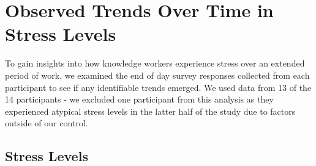 %



\section{Observed Trends Over Time in Stress  Levels}
\label{stressTrends}

To gain insights into how knowledge workers experience stress  over an
extended period of work, we examined the end of day survey responses
collected from each participant to see if any identifiable trends
emerged.  We used data from 13 of the 14 participants - we excluded one participant
from this analysis as they experienced atypical stress
levels in the latter half of the study due to factors outside of our
control.

\subsection{Stress Levels}


